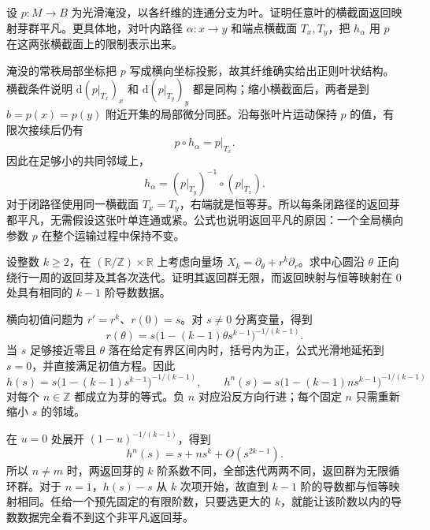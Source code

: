 \begin{exercise}\label{g2:ex:submersion-trivial-holonomy}
	设 \(p:M\to B\) 为光滑淹没，以各纤维的连通分支为叶。证明任意叶的横截面返回映射芽群平凡。更具体地，对叶内路径 \(\alpha:x\to y\) 和端点横截面 \(T_x,T_y\)，把 \(h_\alpha\) 用 \(p\) 在这两张横截面上的限制表示出来。
\end{exercise}
\begin{solution}
	淹没的常秩局部坐标把 \(p\) 写成横向坐标投影，故其纤维确实给出正则叶状结构。横截条件说明 \(\mathrm d(p|_{T_x})_x\) 和 \(\mathrm d(p|_{T_y})_y\) 都是同构；缩小横截面后，两者是到 \(b=p(x)=p(y)\) 附近开集的局部微分同胚。沿每张叶片运动保持 \(p\) 的值，有限次接续后仍有
	\[
		p\circ h_\alpha=p|_{T_x}.
	\]
	因此在足够小的共同邻域上，
	\[
		h_\alpha=(p|_{T_y})^{-1}\circ(p|_{T_x}).
	\]
	对于闭路径使用同一横截面 \(T_x=T_y\)，右端就是恒等芽。所以每条闭路径的返回芽都平凡，无需假设这张叶单连通或紧。公式也说明返回平凡的原因：一个全局横向参数 \(p\) 在整个运输过程中保持不变。
\end{solution}

\begin{exercise}\label{g2:ex:arbitrary-order-parabolic-holonomy}
	设整数 \(k\geq2\)，在 \((\mathbb R/\mathbb Z)\times\mathbb R\) 上考虑向量场 \(X_k=\partial_\theta+r^k\partial_r\)。求中心圆沿 \(\theta\) 正向绕行一周的返回芽及其各次迭代。证明其返回群无限，而返回映射与恒等映射在 \(0\) 处具有相同的 \(k-1\) 阶导数数据。
\end{exercise}
\begin{solution}
	横向初值问题为 \(r'=r^k\)、\(r(0)=s\)。对 \(s\ne0\) 分离变量，得到
	\[
		r(\theta)=s\bigl(1-(k-1)\theta s^{k-1}\bigr)^{-1/(k-1)}.
	\]
	当 \(s\) 足够接近零且 \(\theta\) 落在给定有界区间内时，括号内为正，公式光滑地延拓到 \(s=0\)，并直接满足初值方程。因此
	\[
		h(s)=s\bigl(1-(k-1)s^{k-1}\bigr)^{-1/(k-1)},\qquad
		h^n(s)=s\bigl(1-(k-1)n s^{k-1}\bigr)^{-1/(k-1)}
	\]
	对每个 \(n\in\mathbb Z\) 都成立为芽的等式。负 \(n\) 对应沿反方向行进；每个固定 \(n\) 只需重新缩小 \(s\) 的邻域。

	在 \(u=0\) 处展开 \((1-u)^{-1/(k-1)}\)，得到
	\[
		h^n(s)=s+n s^k+O(s^{2k-1}).
	\]
	所以 \(n\ne m\) 时，两返回芽的 \(k\) 阶系数不同，全部迭代两两不同，返回群为无限循环群。对于 \(n=1\)，\(h(s)-s\) 从 \(k\) 次项开始，故直到 \(k-1\) 阶的导数都与恒等映射相同。任给一个预先固定的有限阶数，只要选更大的 \(k\)，就能让该阶数以内的导数数据完全看不到这个非平凡返回芽。
\end{solution}

